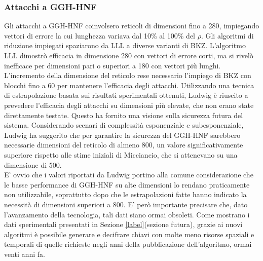 \subsubsection{Attacchi a GGH-HNF}
Gli attacchi a GGH-HNF coinvolsero reticoli di dimensioni fino a 280, impiegando vettori di errore 
la cui lunghezza variava dal 10\% al 100\% del $\rho$. Gli algoritmi di riduzione impiegati spaziarono da
LLL a diverse varianti di BKZ. L'algoritmo LLL dimostrò efficacia in dimensione 280 con vettori di errore corti,
ma si rivelò inefficace per dimensioni pari o superiori a 180 con vettori più lunghi. 
L'incremento della dimensione del reticolo rese necessario l'impiego di BKZ con blocchi fino a 60 per
mantenere l'efficacia degli attacchi. Utilizzando una tecnica di estrapolazione basata sui risultati sperimentali
ottenuti, 
Ludwig è riuscito a prevedere l'efficacia degli attacchi su dimensioni più elevate, 
che non erano state direttamente testate. Questo ha fornito una visione sulla sicurezza futura del 
sistema. Considerando scenari di complessità esponenziale e subesponenziale, Ludwig ha suggerito 
che per garantire la sicurezza del GGH-HNF sarebbero necessarie dimensioni del reticolo di almeno 800, 
un valore significativamente superiore rispetto alle stime iniziali di Micciancio, 
che si attenevano su una dimensione di 500.\\

E' ovvio che i valori riportati da Ludwig portino alla comune considerazione che le basse performance
di GGH-HNF su alte dimensioni lo rendano praticamente non utilizzabile, soprattutto dopo che 
le estrapolazioni fatte hanno indicato la necessità di dimensioni superiori a 800. E' 
però importante precisare che, dato l'avanzamento della tecnologia, tali dati siano ormai obsoleti.
Come mostrano i dati sperimentali presentati in Sezione \ref{label}(sezione futura), grazie ai nuovi
algoritmi è possibile generare e decifrare chiavi con molte meno risorse spaziali e
temporali di quelle richieste negli anni della pubblicazione dell'algoritmo, ormai venti anni fa. 